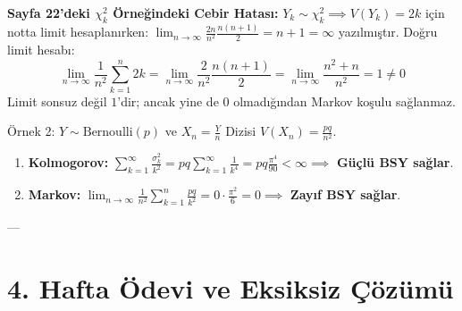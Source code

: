 \documentclass[12pt,a4paper]{article}
\begin{document}
\begin{uyari}
\textbf{Sayfa 22'deki $\chi^2_k$ Örneğindeki Cebir Hatası:}
$Y_k \sim \chi^2_k \implies V(Y_k) = 2k$ için notta limit hesaplanırken: $\lim_{n \to \infty} \frac{2n}{n^2}\frac{n(n+1)}{2} = n+1 = \infty$ yazılmıştır.  
Doğru limit hesabı:
\begin{equation}
    \lim_{n \to \infty} \frac{1}{n^2} \sum_{k=1}^n 2k = \lim_{n \to \infty} \frac{2}{n^2} \frac{n(n+1)}{2} = \lim_{n \to \infty} \frac{n^2 + n}{n^2} = 1 \neq 0
\end{equation}
Limit sonsuz değil $1$'dir; ancak yine de $0$ olmadığından Markov koşulu sağlanmaz.
\end{uyari}

\begin{ornek}{Örnek 2: $Y \sim \text{Bernoulli}(p)$ ve $X_n = \frac{Y}{n}$ Dizisi}
$V(X_n) = \frac{pq}{n^2}$.
\begin{enumerate}
    \item \textbf{Kolmogorov:} $\sum_{k=1}^\infty \frac{\sigma_k^2}{k^2} = pq \sum_{k=1}^\infty \frac{1}{k^4} = pq \frac{\pi^4}{90} < \infty \implies$ \textbf{Güçlü BSY sağlar}.
    \item \textbf{Markov:} $\lim_{n \to \infty} \frac{1}{n^2} \sum_{k=1}^n \frac{pq}{k^2} = 0 \cdot \frac{\pi^2}{6} = 0 \implies$ \textbf{Zayıf BSY sağlar}.
\end{enumerate}
\end{ornek}

---

\section{4. Hafta Ödevi ve Eksiksiz Çözümü}
\end{document}
